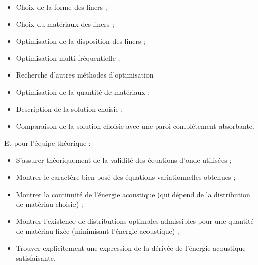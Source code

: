 \begin{itemize}
    \item Choix de la forme des liners ;
    \item Choix du matériaux des liners ;
    \item Optimisation de la disposition des liners ;
    \item Optimisation multi-fréquentielle ;
    \item Recherche d'autres méthodes d'optimisation \item Optimisation de la quantité de matériaux ;
    \item Description de la solution choisie ;
    \item Comparaison de la solution choisie avec une paroi complètement absorbante.
\end{itemize}
Et pour l'équipe théorique :
\begin{itemize}
    \item S'assurer théoriquement de la validité des équations d'onde utilisées ;
    \item Montrer le caractère bien posé des équations variationnelles obtenues ;
    \item Montrer la continuité de l'énergie acoustique (qui dépend de la distribution de matériau choisie) ;
    \item Montrer l'existence de distributions optimales admissibles pour une quantité de matériau fixée (minimisant l'énergie acoustique) ;
    \item Trouver explicitement une expression de la dérivée de l'énergie acoustique satisfaisante.
\end{itemize}